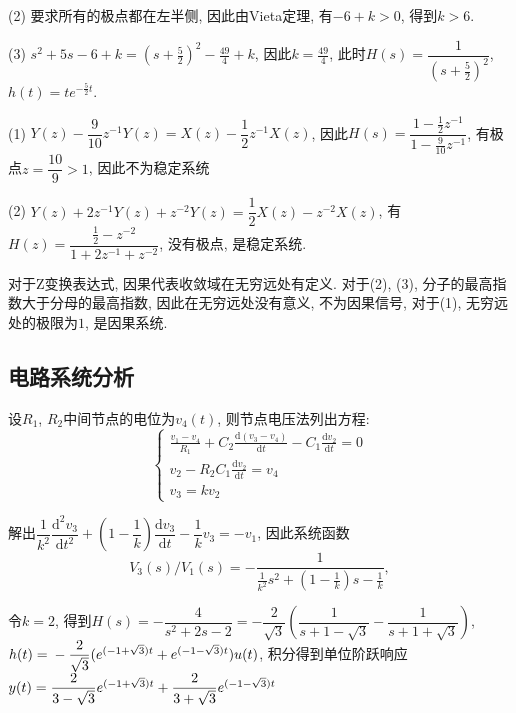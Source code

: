 (2) 要求所有的极点都在左半侧, 因此由Vieta定理, 有$-6+k>0$, 得到$k>6$.

(3) $s^2+5s-6+k=(s+\frac{5}{2})^2-\frac{49}{4}+k$, 因此$k=\frac{49}{4}$, 此时$H(s)=\dfrac{1}{(s+\frac{5}{2})^2}$, $h(t)=te^{-\frac{5}{2}t}$.


(1) $Y(z)-\dfrac{9}{10}z^{-1}Y(z)=X(z)-\dfrac{1}{2}z^{-1}X(z)$, 因此$H(s)=\dfrac{1-\frac{1}{2}z^{-1}}{1-\frac{9}{10}z^{-1}}$, 有极点$z=\dfrac{10}{9}>1$, 因此不为稳定系统

(2) $Y(z)+2z^{-1}Y(z)+z^{-2}Y(z)=\dfrac{1}{2}X(z)-z^{-2}X(z)$, 有$H(z)=\dfrac{\frac{1}{2}-z^{-2}}{1+2z^{-1}+z^{-2}}$, 没有极点, 是稳定系统.


对于Z变换表达式, 因果代表收敛域在无穷远处有定义. 对于(2), (3), 分子的最高指数大于分母的最高指数, 因此在无穷远处没有意义, 不为因果信号, 对于(1), 无穷远处的极限为$1$, 是因果系统.

\subsection{电路系统分析}

设$R_1$, $R_2$中间节点的电位为$v_4(t)$, 则节点电压法列出方程:\begin{equation*}
    \left\{
        \begin{array}{ll}
            \frac{v_1-v_4}{R_1}+C_2\frac{\mathrm d(v_3-v_4)}{\mathrm dt}-C_1\frac{\mathrm dv_2}{\mathrm dt}=0 \\
            v_2-R_2C_1\frac{\mathrm dv_2}{\mathrm dt}=v_4 \\
            v_3=kv_2
        \end{array}
    \right.
\end{equation*}

解出$\dfrac{1}{k^2}\dfrac{\mathrm d^2v_3}{\mathrm dt^2}+(1-\dfrac{1}{k})\dfrac{\mathrm dv_3}{\mathrm dt}-\dfrac{1}{k}v_3=-v_1$, 因此系统函数$$V_3(s)/V_1(s)=-\dfrac{1}{\frac{1}{k^2}s^2+(1-\frac{1}{k})s-\frac{1}{k}},$$

令$k=2$, 得到$H(s)=-\dfrac{4}{s^2+2s-2}=-\dfrac{2}{\sqrt{3}}(\dfrac{1}{s+1-\sqrt{3}}-\dfrac{1}{s+1+\sqrt{3}})$, $h(t)=\\-\dfrac{2}{\sqrt{3}}(e^{(-1+\sqrt{3})t}+e^{(-1-\sqrt{3})t})u(t)$, 积分得到单位阶跃响应$y(t)=\dfrac{2}{3-\sqrt{3}}e^{(-1+\sqrt{3})t}+\\\dfrac{2}{3+\sqrt{3}}e^{(-1-\sqrt{3})t}$ 

